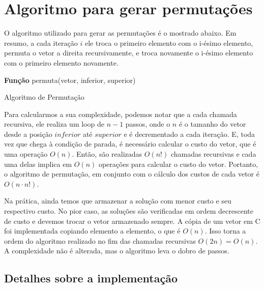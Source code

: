 \documentclass[a4paper, 12pt]{article} %
\begin{document}
	\section{Algoritmo para gerar permutações}
	
	O algoritmo utilizado para gerar as permutações é o mostrado abaixo. Em resumo, a cada iteração $i$ ele troca o primeiro elemento com o i-ésimo elemento, permuta o vetor a direita recursivamente, e troca novamente o i-ésimo elemento com o primeiro elemento novamente.
	
	\begin{algorithm}[h]
	\textbf{Função} permuta(vetor, inferior, superior) 
	
	\caption{Algoritmo de Permutação}
	\end{algorithm}
	
	Para calcularmos a sua complexidade, podemos notar que a cada chamada recursiva, ele realiza um loop de $n - 1$ passos, onde o $n$ é o tamanho do vetor desde a posição $inferior$ até $superior$ e é decrementado a cada iteração. E, toda vez que chega à condição de parada, é necessário calcular o custo do vetor, que é uma operação $O(n)$. Então, são realizadas $O(n!)$ chamadas recursivas e cada uma delas implica em $O(n)$ operações para calcular o custo do vetor. Portanto, o algoritmo de permutação, em conjunto com o cálculo dos custos de cada vetor é $O(n \cdot n!)$.
	
	Na prática, ainda temos que armazenar a solução com menor custo e seu respectivo custo. No pior caso, as soluções são verificadas em ordem decrescente de custo e devemos trocar o vetor armazenado sempre. A cópia de um vetor em C foi implementada copiando elemento a elemento, o que é $O(n)$. Isso torna a ordem do algoritmo realizado no fim das chamadas recursivas $O(2n) = O(n)$. A complexidade não é alterada, mas o algoritmo leva o dobro de passos.  
	
	\subsection{Detalhes sobre a implementação}
		
\end{document}
